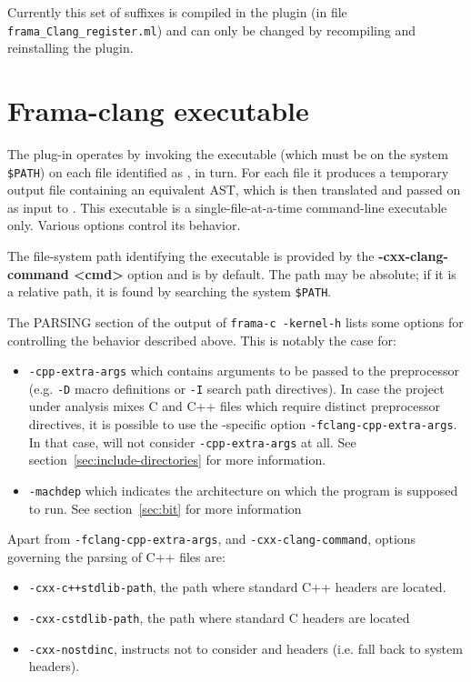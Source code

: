 Currently this set of suffixes is compiled in the plugin (in file
\texttt{frama\_Clang\_register.ml}) and can only be changed by
recompiling and reinstalling the plugin.

\section{Frama-clang executable}
The plug-in operates by invoking the executable \irg (which must be on the system \verb|$PATH|)
on each file identified as \cpp, in turn. 
For each file it produces a temporary output file containing an equivalent \C AST, which is then translated and passed on as input to \framac. 
This executable is a single-file-at-a-time command-line executable only. 
Various options control its behavior.

The file-system path identifying the executable is provided by the \textbf{-cxx-clang-command <cmd>}
option and is \irg by default. The path may be absolute; if it is a relative path, it is found by searching the system \verb|$PATH|.


The PARSING section of the output of \lstinline|frama-c -kernel-h|
lists some options for controlling the behavior described above. This is notably
the case for:
\begin{itemize}
\item \lstinline|-cpp-extra-args| which contains arguments to be passed to the
preprocessor (e.g. \lstinline|-D| macro definitions or \lstinline|-I|
search path directives). In case the project under analysis mixes C and
C++ files which
require distinct preprocessor directives, it is possible to use the
\fclang-specific option \lstinline|-fclang-cpp-extra-args|.
In that case, \fclang will not consider \lstinline|-cpp-extra-args| at all.
See section~\ref{sec:include-directories} for more information.
\item \lstinline|-machdep| which indicates the architecture on
which the program is supposed to run. See section~\ref{sec:bit} for more
information
\end{itemize}

Apart from \lstinline|-fclang-cpp-extra-args|, and
\lstinline|-cxx-clang-command|, \fclang options governing the
parsing of C++ files are:
\begin{itemize}
\item \lstinline|-cxx-c++stdlib-path|, the path where \fclang standard C++
  headers are located.
\item \lstinline|-cxx-cstdlib-path|, the path where \framac standard C headers
  are located
\item \lstinline|-cxx-nostdinc|, instructs \irg not to consider \fclang and
\framac headers (i.e. fall back to system headers).
\end{itemize}

